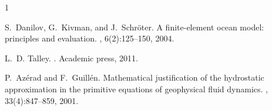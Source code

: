 \documentclass[11pt]{article}
\begin{document}
\nocite{*}

\begin{thebibliography}{1}

S.~Danilov, G.~Kivman, and J.~Schr{\"o}ter.
\newblock A finite-element ocean model: principles and evaluation.
, 6(2):125--150, 2004.

L.~D. Talley.
.
\newblock Academic press, 2011.

P.~Az{\'e}rad and F.~Guill{\'e}n.
\newblock Mathematical justification of the hydrostatic approximation in the
  primitive equations of geophysical fluid dynamics.
, 33(4):847--859, 2001.

\end{thebibliography}
\end{document}
